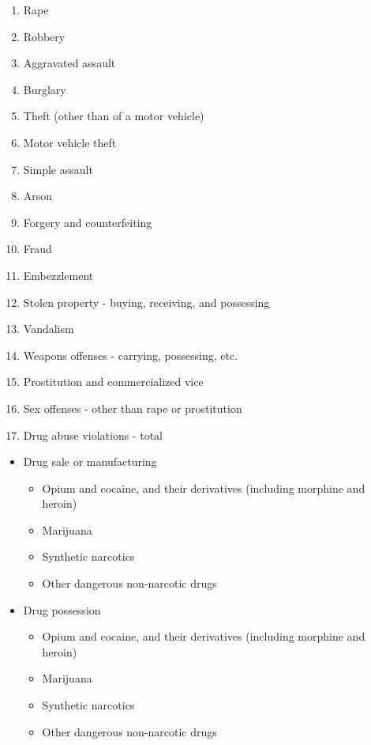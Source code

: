 \documentclass[
  12pt,
  openany]{book}
\providecommand{\tightlist}{%
  \setlength{\itemsep}{0pt}\setlength{\parskip}{0pt}}
\begin{document}
\begin{enumerate}
\def\labelenumi{\arabic{enumi}.}
\setcounter{enumi}{1}
\tightlist
\item
  Rape
\item
  Robbery
\item
  Aggravated assault
\item
  Burglary
\item
  Theft (other than of a motor vehicle)
\item
  Motor vehicle theft
\item
  Simple assault
\item
  Arson
\item
  Forgery and counterfeiting
\item
  Fraud
\item
  Embezzlement
\item
  Stolen property - buying, receiving, and possessing
\item
  Vandalism
\item
  Weapons offenses - carrying, possessing, etc.
\item
  Prostitution and commercialized vice
\item
  Sex offenses - other than rape or prostitution
\item
  Drug abuse violations - total
\end{enumerate}

\begin{itemize}
\tightlist
\item
  Drug sale or manufacturing

  \begin{itemize}
  \tightlist
  \item
    Opium and cocaine, and their derivatives (including morphine and heroin)
  \item
    Marijuana
  \item
    Synthetic narcotics
  \item
    Other dangerous non-narcotic drugs
  \end{itemize}
\item
  Drug possession

  \begin{itemize}
  \tightlist
  \item
    Opium and cocaine, and their derivatives (including morphine and heroin)
  \item
    Marijuana
  \item
    Synthetic narcotics
  \item
    Other dangerous non-narcotic drugs
  \end{itemize}
\end{itemize}
\end{document}
